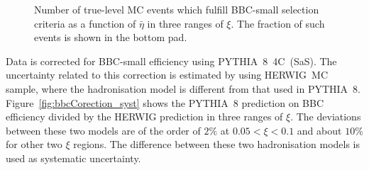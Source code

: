 \begin{figure}[h!]
\begin{subfigure}{.45\textwidth}
	\end{subfigure}
	\begin{minipage}{.45\textwidth}
		\caption{Number of true-level MC events which fulfill BBC-small selection criteria  as a function of $\bar{\eta}$ in three ranges of $\xi$. The fraction of such events is shown in the bottom pad.}
		\label{fig:bbcCorection_eta}
	\end{minipage}
	
\end{figure}

Data is corrected for BBC-small efficiency using PYTHIA~8~4C~(SaS).  The uncertainty related to this correction is  estimated by using HERWIG~MC sample, where the hadronisation model is different from that used in PYTHIA~8. Figure~\ref{fig:bbcCorection_syst} shows the PYTHIA~8  prediction on BBC efficiency  divided by the HERWIG prediction in three ranges of $\xi$. The deviations between these two models are of the order of $2\%$ at $0.05<\xi<0.1$ and about $10\%$ for  other two $\xi$ regions. The difference between these two hadronisation models is used as systematic uncertainty.


